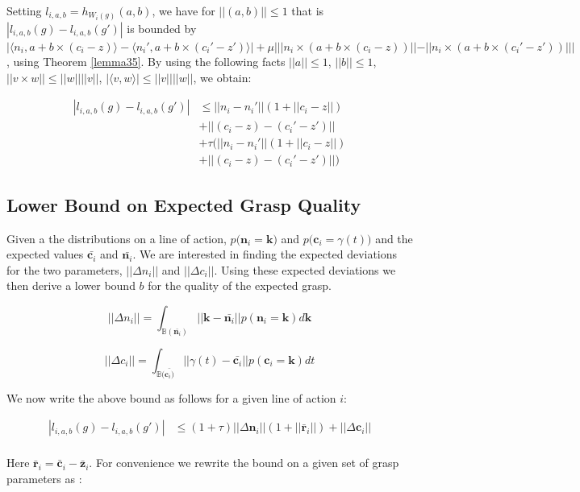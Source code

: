 \documentclass[letterpaper, 10 pt, conference]{ieeeconf}  %
\begin{document}
Setting $l_{i,a,b} = h_{W_i(g)}(a,b)$, we have for $||(a,b)|| \leq 1$ that is $|l_{i,a,b}(g) - l_{i,a,b}(g')|$ is bounded by $|\langle n_i,a+b\times (c_i-z)\rangle - \langle n_i',a+b\times(c_i'-z')\rangle|+\mu|||n_i \times (a+b \times (c_i -z))|| - ||n_i \times (a + b \times (c_i' - z')) |||$, using Theorem \ref{lemma35}.
By using the following facts $||a|| \leq 1$, $||b|| \leq 1$, $||v \times w || \leq ||w||||v||$, $|\langle v,w\rangle | \leq ||v||||w||$, we obtain:  

\begin{align*}
|l_{i,a,b}(g) - l_{i,a,b}(g')| &\leq ||n_i - n_i'||(1+||c_i - z||) \\
					&+ ||(c_i - z)-(c_i'-z')|| \\
					&+ \tau(||n_i - n_i'||(1+||c_i - z||)\\
					&+||(c_i - z)-(c_i'-z')||)
\end{align*}

\subsection{Lower Bound on Expected Grasp Quality}
Given a the distributions on a line of action, $p\big(\textbf{n}_i = \textbf{k}\big)$ and $p\big(\textbf{c}_i=\gamma(t) \big)$ and the expected values $\bar{\textbf{c}_i}$ and $\bar{\textbf{n}_i}$. We are interested in finding the expected deviations for the two parameters, $||\Delta n_i||$ and  $||\Delta c_i||$. Using these expected deviations we then derive a lower bound $b$ for the quality of the expected grasp. 

\[
  ||\Delta n_i|| =  \int_{\mathbb{B}(\bar{\textbf{n}_i})} ||\textbf{k} - \bar{\textbf{n}_i}|| p(\textbf{n}_i = \textbf{k}) d\textbf{k}
\]

\[
  ||\Delta c_i|| =  \int_{\mathbb{B}(\bar{\textbf{c}_i)}} ||\gamma(t) - \bar{\textbf{c}_i}|| p(\textbf{c}_i = \textbf{k}) dt
\]

We now write the above bound as follows for a given line of action $i$: 

 \begin{align*}
|l_{i,a,b}(g) - l_{i,a,b}(g')| & \leq (1+\tau)||\Delta \textbf{n}_{i}||(1+||\bar{\textbf{r}}_i||) + ||\Delta{\textbf{c}_{i}}|| \\
  \end{align*}

Here $\bar{\textbf{r}}_i = \bar{\textbf{c}}_i - \bar{\textbf{z}}_i$. For convenience we rewrite the bound on a given set of grasp parameters as : 
\end{document}
